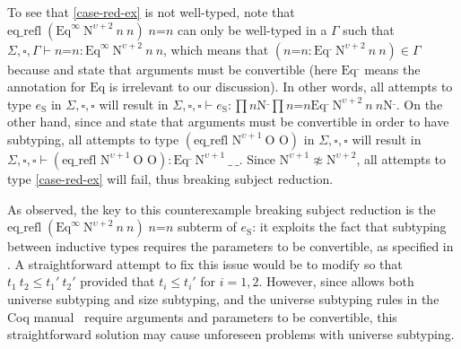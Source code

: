 To see that \eqref{case-red-ex} is not well-typed, note that
$\textrm{eq\_refl} \; (\textrm{Eq}^\infty ~
\textrm{N}^{\upsilon+2} ~ n ~ n) \; n\textrm{=}n$
can only be well-typed in a $\Gamma$ such that
$\Sigma,\square,\Gamma \vdash n\textrm{=}n : \textrm{Eq}^\infty ~ \textrm{N}^{\upsilon+2} ~ n ~ n$,
which means that $(n\textrm{=}n : \textrm{Eq}^\_ ~ \textrm{N}^{\upsilon+2} ~ n ~ n) \in \Gamma$
because  and  state that arguments
must be convertible (here $\textrm{Eq}^\_$ means the annotation for
$\textrm{Eq}$ is irrelevant to our discussion).
%
In other words, all attempts to type $e_{\textrm{S}}$ in $\Sigma,\square,\square$
will result in
$\Sigma,\square,\square \vdash e_{\textrm{S}} : \prod{n}{\textrm{N}^\_}{\prod{n\textrm{=}n}{\textrm{Eq}^\_ ~ \textrm{N}^{\upsilon+2} ~ n ~ n}{\textrm{N}^\_}}$.
%
On the other hand, since  and  state
that arguments must be convertible in order to have subtyping,
all attempts to type $(\textrm{eq\_refl N}^{\upsilon+1} ~ \textrm{O O})$
in $\Sigma,\square,\square$ will result in
$\Sigma,\square,\square \vdash
(\textrm{eq\_refl N}^{\upsilon+1} ~ \textrm{O O}) :
\textrm{Eq}^\_ ~ \textrm{N}^{\upsilon+1} ~ \_ ~ \_$.
%
Since $\textrm{N}^{\upsilon+1} \napprox \textrm{N}^{\upsilon+2}$, all attempts
to type \eqref{case-red-ex} will fail, thus breaking subject
reduction.

As observed, the key to this counterexample
breaking subject reduction is the $\textrm{eq\_refl} \;
(\textrm{Eq}^\infty \allowbreak ~ \textrm{N}^{\upsilon+2} ~ n ~ n) \; n\textrm{=}n$
subterm of $e_{\textrm{S}}$:
%
it exploits the fact that subtyping between inductive types
requires the parameters to be convertible, as specified in
.
%
A straightforward attempt to fix this issue would be to modify
 so that $t_1 ~ t_2 \leq t_1' ~ t_2'$ provided that
$t_i \leq t_i'$ for $i = 1,2$.
%
%
However, since \lang allows both universe subtyping and size subtyping,
and the universe subtyping rules in the Coq
manual~\citep{coq} require arguments and parameters to be convertible,
this straightforward solution may cause unforeseen
problems with universe subtyping.


